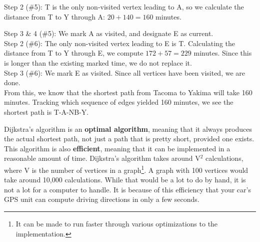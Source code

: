 \begin{example}{}
\noindent Step 2 (\#5):  T is the only non-visited vertex leading to A, so we calculate the distance from T to Y through A:  $20+140 = 160$ minutes.  \\
\par{}\label{fig:graphtheory-dor1-tikz22}%


\noindent Step 3 \& 4 (\#5):  We mark A as visited, and designate E as current.\\

\noindent Step 2 (\#6):  The only non-visited vertex leading to E is T.  Calculating the distance from T to Y through E, we compute $172+57 = 229$ minutes.  Since this is longer than the existing marked time, we do not replace it.  \\

\noindent Step 3 (\#6):  We mark E as visited.  Since all vertices have been visited, we are done.  \\

From this, we know that the shortest path from Tacoma to Yakima will take 160 minutes.  Tracking which sequence of edges yielded 160 minutes, we see the shortest path is T-A-NB-Y.
\end{example}

Dijkstra's algorithm is an \textbf{optimal algorithm}, meaning that it always produces the actual shortest path, not just a path that is pretty short, provided one exists.  This algorithm is also \textbf{efficient}, meaning that it can be implemented in a reasonable amount of time.  Dijkstra's algorithm takes around V$^2$ calculations, where V is the number of vertices in a graph\footnote{It can be made to run faster through various optimizations to the implementation.}.  A graph with 100 vertices would take around 10,000 calculations.  While that would be a lot to do by hand, it is not a lot for a computer to handle.  It is because of this efficiency that your car's GPS unit can compute driving directions in only a few seconds.  
 
